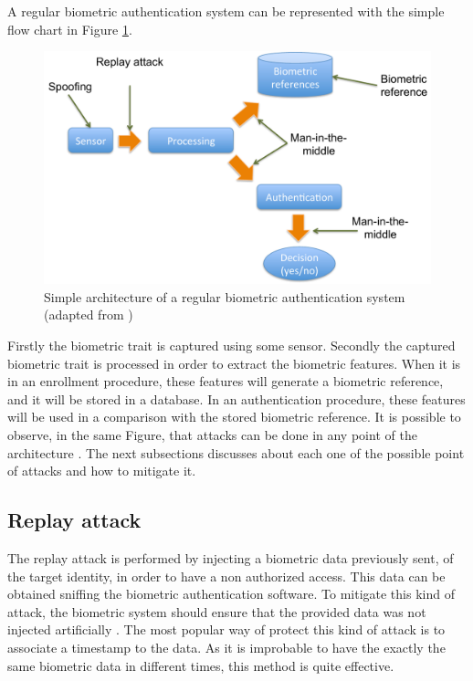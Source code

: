 A regular biometric authentication system can be represented with the simple flow chart in Figure \ref{fig:diagram_attacks}.
\begin{figure}[!htb]
\begin{center}
\includegraphics [width=14cm] {images/diagram_attacks.pdf}
\caption[]{Simple architecture of a regular biometric authentication system (adapted from \cite{xiao2005security})} \label{fig:diagram_attacks}
\end{center}
\end{figure}

Firstly the biometric trait is captured using some sensor. Secondly the captured biometric trait is processed in order to extract the biometric features. When it is in an enrollment procedure, these features will generate a biometric reference, and it will be stored in a database. In an authentication procedure, these features will be used in a comparison with the stored biometric reference. It is possible to observe, in the same Figure, that attacks can be done in any point of the architecture \cite{xiao2005security}. The next subsections discusses about each one of the possible point of attacks and how to mitigate it.


\subsection{Replay attack}
\label{sec:rep}

The replay attack is performed by injecting a biometric data previously sent, of the target identity, in order to have a non authorized access. This data can be obtained sniffing the biometric authentication software. To mitigate this kind of attack, the biometric system should ensure that the provided data was not injected artificially \cite{xiao2005security}. The most  popular way of protect this kind of attack is to associate a timestamp to the data. As it is improbable to have the exactly the same biometric data in different times, this method is quite effective.

